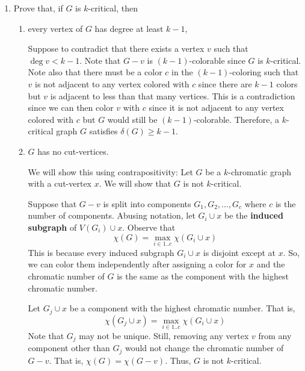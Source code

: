 \begin{enumerate}[label=(\roman*)]
    \item Prove that, if \(G\) is \(k\)-critical, then
      \begin{enumerate}[label=(\alph*)]
        \item every vertex of \(G\) has degree at least \(k-1\),
          \begin{solution}
            Suppose to contradict that there exists a vertex
            \(v\) such that \(\deg v < k-1\). Note that \(G-v\)
            is \((k-1)\)-colorable since \(G\) is \(k\)-critical.
            Note also that there must be a color \(c\) in the
            \((k-1)\)-coloring such that \(v\) is not adjacent to
            any vertex colored with \(c\) since there are \(k-1\)
            colors but \(v\) is adjacent to less than that many
            vertices. This is a contradiction since we can then
            color \(v\) with \(c\) since it is not adjacent to
            any vertex colored with \(c\) but \(G\) would still
            be \((k-1)\)-colorable. Therefore, a \(k\)-critical
            graph \(G\) satisfies \(\delta(G) \geq k-1\).
          \end{solution}

        \item \(G\) has no cut-vertices.
          \begin{solution}
            We will show this using contrapositivity: Let \(G\)
            be a \(k\)-chromatic graph with a cut-vertex \(x\).
            We will show that \(G\) is not \(k\)-critical.

            Suppose that \(G-v\) is split into components
            \(G_1, G_2, \ldots, G_c\) where \(c\) is the number
            of components. Abusing notation, let \(G_i \cup
            x\) be the \textbf{induced subgraph} of \(V(G_i)
            \cup x\). Observe that 
            \[
              \chi(G) =
              \max_{i \in 1..c} \chi(G_i \cup x)
            \]
            This is because every induced subgraph \(G_i \cup x\)
            is disjoint except at \(x\). So, we can color them
            independently after assigning a color for \(x\) and
            the chromatic number of \(G\) is the same as the
            component with the highest chromatic number.

            Let \(G_j \cup x\) be a component with the highest
            chromatic number. That is, 
            \[
              \chi(G_j \cup x) = \max_{i \in 1..c} \chi(G_i \cup x) 
            \]
            Note that \(G_j\) may not be unique. Still, removing
            any vertex \(v\) from any component other than \(G_j\)
            would not change the chromatic number of \(G-v\).
            That is, \(\chi(G) = \chi(G-v)\). Thus, \(G\) is not
            \(k\)-critical.
          \end{solution}
      \end{enumerate}
  \end{enumerate}
